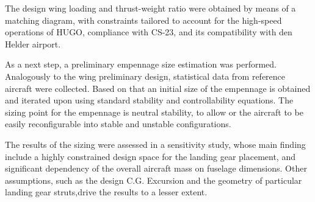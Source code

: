 The design wing loading and thrust-weight ratio were obtained by means of a matching diagram, with constraints tailored to account for the high-speed operations of HUGO, compliance with CS-23, and its compatibility with den Helder airport.

As a next step, a preliminary empennage size estimation was performed. Analogously to the wing preliminary design, statistical data from reference aircraft were collected. Based on that an initial size of the empennage is obtained and iterated upon using standard stability and controllability equations. The sizing point for the empennage is neutral stability, to allow or the aircraft to be easily reconfigurable into stable and unstable configurations.

The results of the sizing were assessed in a sensitivity study, whose main finding include a highly constrained design space for the landing gear placement, and significant dependency of the overall aircraft mass on fuselage dimensions. Other assumptions, such as the design C.G. Excursion and the geometry of particular landing gear struts,drive the results to a lesser extent.

    

    


    
    
